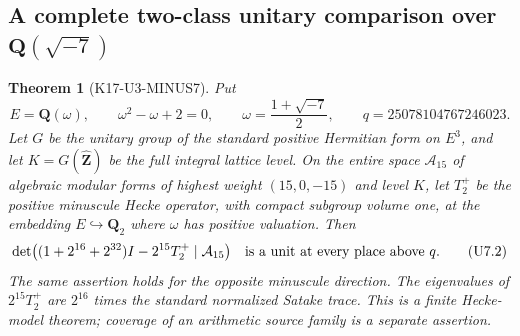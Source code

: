 \documentclass[11pt,a4paper]{article}
\newtheorem{theorem}{Theorem}[section]
\theoremstyle{definition}
\begin{document}
\subsection{A complete two-class unitary comparison over \texorpdfstring{$\mathbf Q(\sqrt{-7})$}{Q(sqrt(-7))}}
\label{sec:u3-minus7}

\begin{theorem}[K17-U3-MINUS7]\label{thm:u3-minus7-unit}
Put
\[
 E=\mathbf Q(\omega),\qquad \omega^2-\omega+2=0,
 \qquad \omega=\frac{1+\sqrt{-7}}2,
 \qquad q=25078104767246023.
 \tag{U7.1}
\]
Let $G$ be the unitary group of the standard positive Hermitian form
on $E^3$, and let $K=G(\widehat{\mathbf Z})$ be the full integral
lattice level. On the \emph{entire} space $\mathcal A_{15}$ of
algebraic modular forms of highest weight $(15,0,-15)$ and level $K$,
let $T_2^+$ be the positive minuscule Hecke operator, with compact
subgroup volume one, at the embedding $E\hookrightarrow\mathbf Q_2$
where $\omega$ has positive valuation. Then
\[
 \det\bigl((1+2^{16}+2^{32})I-2^{15}T_2^+
                  \mid\mathcal A_{15}\bigr)
 \quad\hbox{is a unit at every place above }q.
 \tag{U7.2}
\]
The same assertion holds for the opposite minuscule direction.
The eigenvalues of $2^{15}T_2^+$ are $2^{16}$ times the standard
normalized Satake trace. This is a finite Hecke-model theorem;
coverage of an arithmetic source family is a separate assertion.
\end{theorem}
\end{document}
